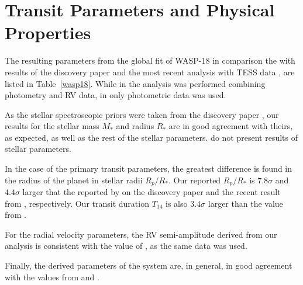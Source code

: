 \section{Transit Parameters and Physical Properties}\label{transitparams}

The resulting parameters from the global fit of WASP-18 in comparison the with results of the discovery paper \cite{Hellier2009} and the most recent analysis with TESS data \citep{Shporer2018}, are listed in Table~\ref{wasp18}. While in \cite{Hellier2009} the analysis was performed combining photometry and RV data, in \cite{Shporer2018} only photometric data was used. 

As the stellar spectroscopic priors were taken from the discovery paper \cite{Hellier2009}, our results for the stellar mass $M_*$ and radius $R_*$ are in good agreement with theirs, as expected, as well as the rest of the stellar parameters. \cite{Shporer2018} do not present results of stellar parameters.

In the case of the primary transit parameters, the greatest difference is found in the radius of the planet in stellar radii $R_{p}/R_{*}$. Our reported $R_{p}/R_{*}$ is $7.8\sigma$ and $4.4\sigma$ larger that the reported by \cite{Hellier2009} on the discovery paper and the recent result from \cite{Shporer2018}, respectively.  Our transit duration $T_{14}$ is also $3.4\sigma$ larger than the value from \cite{Hellier2009}.

For the radial velocity parameters, the RV semi-amplitude derived from our analysis is consistent with the value of \cite{Hellier2009}, as the same data was used. 

Finally, the derived parameters of the system are, in general, in good agreement with the values from \cite{Hellier2009} and \cite{Shporer2018}. 

